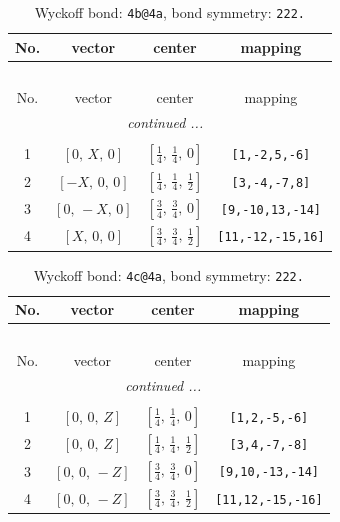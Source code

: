 \documentclass[fleqn,8pt]{jsarticle}
\begin{document}
\begin{longtable}{cccc}
\caption{Wyckoff bond: {\tt 4b@4a}, bond symmetry: {\tt 222.}}
 \\
 \hline \hline
No. & vector & center & mapping \\ \hline \endfirsthead

\multicolumn{3}{l}{\tablename\ \thetable{}} \\
 \hline \hline
No. & vector & center & mapping \\ \hline \endhead

 \hline \hline
\multicolumn{3}{r}{\footnotesize\it continued ...} \\ \endfoot

 \hline \hline
\multicolumn{3}{r}{} \\ \endlastfoot

1 & $\left[ 0,\, X,\, 0 \right]$ & $\left[ \frac{1}{4},\, \frac{1}{4},\, 0 \right]$ & {\tt [1,-2,5,-6]} \\ \hline
2 & $\left[ - X,\, 0,\, 0 \right]$ & $\left[ \frac{1}{4},\, \frac{1}{4},\, \frac{1}{2} \right]$ & {\tt [3,-4,-7,8]} \\ \hline
3 & $\left[ 0,\, - X,\, 0 \right]$ & $\left[ \frac{3}{4},\, \frac{3}{4},\, 0 \right]$ & {\tt [9,-10,13,-14]} \\ \hline
4 & $\left[ X,\, 0,\, 0 \right]$ & $\left[ \frac{3}{4},\, \frac{3}{4},\, \frac{1}{2} \right]$ & {\tt [11,-12,-15,16]} \\
\end{longtable}
\renewcommand{\arraystretch}{1.2}
\begin{longtable}{cccc}
\caption{Wyckoff bond: {\tt 4c@4a}, bond symmetry: {\tt 222.}}
 \\
 \hline \hline
No. & vector & center & mapping \\ \hline \endfirsthead

\multicolumn{3}{l}{\tablename\ \thetable{}} \\
 \hline \hline
No. & vector & center & mapping \\ \hline \endhead

 \hline \hline
\multicolumn{3}{r}{\footnotesize\it continued ...} \\ \endfoot

 \hline \hline
\multicolumn{3}{r}{} \\ \endlastfoot

1 & $\left[ 0,\, 0,\, Z \right]$ & $\left[ \frac{1}{4},\, \frac{1}{4},\, 0 \right]$ & {\tt [1,2,-5,-6]} \\ \hline
2 & $\left[ 0,\, 0,\, Z \right]$ & $\left[ \frac{1}{4},\, \frac{1}{4},\, \frac{1}{2} \right]$ & {\tt [3,4,-7,-8]} \\ \hline
3 & $\left[ 0,\, 0,\, - Z \right]$ & $\left[ \frac{3}{4},\, \frac{3}{4},\, 0 \right]$ & {\tt [9,10,-13,-14]} \\ \hline
4 & $\left[ 0,\, 0,\, - Z \right]$ & $\left[ \frac{3}{4},\, \frac{3}{4},\, \frac{1}{2} \right]$ & {\tt [11,12,-15,-16]} \\
\end{longtable}
\end{document}
